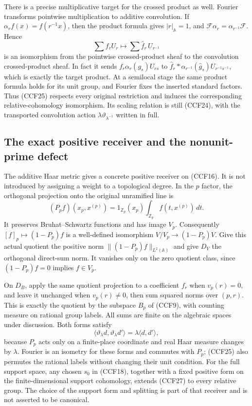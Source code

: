 There is a precise multiplicative target for the crossed
product as well. Fourier transforms pointwise multiplication
to additive convolution. If $\alpha_r f(x)=f(r^{-1}x)$, then
the product formula gives $|r|_{\mathbb A}=1$, and
$\mathcal F\alpha_r=\alpha_{r^{-1}}\mathcal F$. Hence
\[
 \sum f_rU_r\longmapsto\sum\widehat f_r\,U_{r^{-1}}
 \tag{CCF25}
\]
is an isomorphism from the pointwise crossed-product sheaf
to the convolution crossed-product sheaf. In fact it sends
$f_r\alpha_r(g_s)U_{rs}$ to
$\widehat f_r*\alpha_{r^{-1}}(\widehat g_s)U_{r^{-1}s^{-1}}$,
which is exactly the target product. At a semilocal stage the
same product formula holds for its unit group, and Fourier
fixes the inserted standard factors. Thus (CCF25) respects
every original restriction and induces the corresponding
relative-cohomology isomorphism. Its scaling relation is still
(CCF24), with the transported convolution action
$\lambda\vartheta_{\lambda^{-1}}$ written in full.

\subsection{The exact positive receiver and the nonunit-prime defect}

The additive Haar metric gives a concrete positive receiver
on (CCF16). It is not introduced by assigning a weight to a
topological degree. In the $p$ factor, the orthogonal projection
onto the original unramified line is
\[
 (P_pf)(x_p,x^{(p)})=1_{\mathbb Z_p}(x_p)
                \int_{\mathbb Z_p}f(t,x^{(p)})\,dt.
 \tag{CCF26}
\]
It preserves Bruhat--Schwartz functions and has image $V_p$.
Consequently $[f]_p\mapsto(1-P_p)f$ is a well-defined
isomorphism $V/V_p\to(1-P_p)V$. Give this actual quotient
the positive norm $\|(1-P_p)f\|_{L^2(\mathbb A)}$ and give
$D_V$ the orthogonal direct-sum norm. It vanishes only on the
zero quotient class, since $(1-P_p)f=0$ implies $f\in V_p$.

On $D_B$, apply the same quotient projection to a coefficient
$f_r$ when $v_p(r)=0$, and leave it unchanged when
$v_p(r)\ne0$, then sum squared norms over $(p,r)$.
This is exactly the quotient by the subspace $B_p$ of (CCF9),
with counting measure on rational group labels. All sums are
finite on the algebraic spaces under discussion. Both forms
satisfy
\[
 \langle\vartheta_\lambda d,\vartheta_\lambda d'\rangle
       =\lambda\langle d,d'\rangle,
 \tag{CCF27}
\]
because $P_p$ acts only on a finite-place coordinate and real
Haar measure changes by $\lambda$. Fourier is an isometry
for these forms and commutes with $P_p$; (CCF25) also permutes
the rational labels without changing their unit condition.
For the full support space, any chosen $s_0$ in (CCF18),
together with a fixed positive form on the finite-dimensional
support cohomology, extends (CCF27) to every relative group.
The choice of the support form and splitting is part of that
receiver and is not asserted to be canonical.

